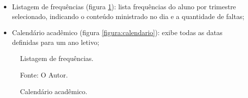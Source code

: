 \begin{itemize}
	\item Listagem de frequências (figura \ref{figura:freq}): lista frequências do aluno por trimestre selecionado, indicando o conteúdo ministrado no dia e a quantidade de faltas;
	\item Calendário acadêmico (figura \ref{figura:calendario}): exibe todas as datas definidas para um ano letivo;
\end{itemize}

\begin{figure}[H]
    \begin{minipage}[b]{0.45\linewidth}
        \caption{Listagem de frequências.}
    	\centering %
    	\label{figura:freq}
    	\captionsetup{singlelinecheck = false, format= hang, justification=raggedright, labelsep=space, width=6.5cm}
    	\caption*{\footnotesize Fonte: O Autor.}
    \end{minipage}
    \hspace{0.5cm}
    \begin{minipage}[b]{0.45\linewidth}
        \caption{Calendário acadêmico.}
    	\centering %

\end{minipage}
\end{figure}
